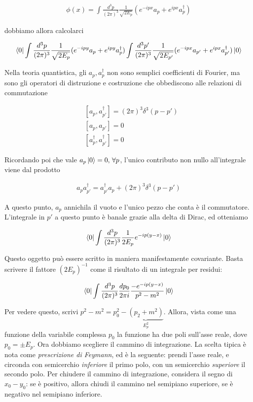 \documentclass[11pt]{report}
\begin{document}
\begin{align}
    \phi(x) = \int \frac{d^3p}{(2\pi)^3}\frac{1}{\sqrt{2E_p}}(e^{-ipx}a_p + e^{ipx}a^\dagger_p)
\end{align}

dobbiamo allora calcolarci 

\begin{align}
    \bra{0}\int \frac{d^3p}{(2\pi)^3}\frac{1}{\sqrt{2E_p}}(e^{-ipy}a_p + e^{ipy}a^\dagger_p)\int \frac{d^3p'}{(2\pi)^3}\frac{1}{\sqrt{2E_{p'}}}(e^{-ipx}a_{p'} + e^{ipx}a^\dagger_{p'})\ket{0}
\end{align}

Nella teoria quantistica, gli \(a_p, a^\dagger_p\) non sono semplici coefficienti di Fourier, ma sono gli operatori di distruzione e costruzione che obbediscono alle relazioni di commutazione 

\begin{align}
    &[a_p, a^\dagger_{p'}] = (2\pi)^3\delta^3(p-p') \\
    &[a_p, a_{p'}] = 0 \\
    &[a^\dagger_p, a^\dagger_{p'}] = 0 
\end{align}

Ricordando poi che vale \(a_p \ket{0} = 0, \, \forall p\), l'unico contributo non nullo all'integrale viene dal prodotto 

\begin{align}
    a_pa^\dagger_{p'} = a^\dagger_{p'}a_p + (2\pi)^3 \delta^3(p-p')
\end{align}

A questo punto, \(a_p\) annichila il vuoto e l'unico pezzo che conta è il commutatore. L'integrale in \(p'\) a questo punto è banale grazie alla delta di Dirac, ed otteniamo 

\begin{align}
    \bra{0}\int \frac{d^3p}{(2\pi)^3}\frac{1}{2E_p}e^{-ip(y-x)}\ket{0}
\end{align}

Questo oggetto può essere scritto in maniera manifestamente covariante. Basta scrivere il fattore \((2E_p)^{-1}\) come il risultato di un integrale per residui: 

\begin{align}
    \bra{0}\int \frac{d^3p}{(2\pi)^3}\frac{dp_0}{2\pi i }\frac{-e^{-ip(y-x)}}{p^2 - m^2} \ket{0}
\end{align}

Per vedere questo, scrivi \(p^2 -m^2 = p_0^2 -\underbrace{(p_2 + m^2)}_{E^2_p} \). Allora, vista come una funzione della variabile complessa \(p_0\) la funzione ha due poli sull'asse reale, dove \(p_0 = \pm E_p\). Ora dobbiamo scegliere il cammino di integrazione. La scelta tipica è nota come \emph{prescrizione di Feymann}, ed è la seguente: prendi l'asse reale, e circonda con semicerchio \emph{inferiore} il primo polo, con un semicerchio \emph{superiore} il secondo polo. Per chiudere il cammino di integrazione, considera il segno di \(x_0-y_0\): se è positivo, allora chiudi il cammino nel semipiano superiore, se è negativo nel semipiano inferiore.  
\end{document}
